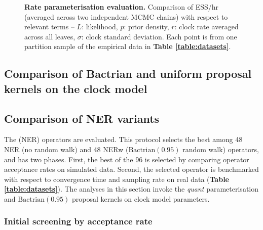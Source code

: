 \documentclass[10pt,letterpaper]{article}
\begin{document}





\begin{figure}[!h]
\caption{\textbf{Rate parameterisation evaluation.} Comparison of ESS/hr (averaged across two independent MCMC chains) with respect to relevant terms -- $L$: likelihood, $p$: prior density, $r$: clock rate averaged across all leaves, $\sigma$: clock standard deviation. Each point is from one partition sample of the empirical data in \textbf{Table \ref{table:datasets}}.  }
\label{fig:parameterisationResults}
\end{figure}







\subsection*{Comparison of Bactrian and uniform proposal kernels on the clock model}



\subsection*{Comparison of NER variants}

The \textbf{} (NER) operators are evaluated. This protocol selects the best among 48 NER (no random walk) and 48 NERw ($\text{Bactrian}(0.95)$ random walk) operators, and has two phases. First, the best of the 96 is selected by comparing operator acceptance rates on simulated data. Second, the selected operator is benchmarked with respect to convergence time and sampling rate on real data (\textbf{Table \ref{table:datasets}}). The analyses in this section invoke the \textit{quant} parameterisation and $\text{Bactrian}(0.95)$ proposal kernels on clock model parameters.




\subsubsection*{Initial screening by acceptance rate}
\end{document}
